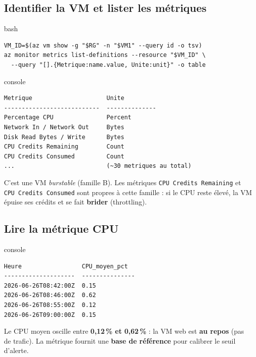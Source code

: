 \documentclass[11pt,a4paper]{article}
\newcommand{\code}[1]{\texttt{#1}}
\begin{document}
\subsection{Identifier la VM et lister les métriques}
\begin{codebox}{bash}
\begin{Verbatim}
VM_ID=$(az vm show -g "$RG" -n "$VM1" --query id -o tsv)
az monitor metrics list-definitions --resource "$VM_ID" \
  --query "[].{Metrique:name.value, Unite:unit}" -o table
\end{Verbatim}
\end{codebox}
\begin{codebox}{console}
\begin{Verbatim}
Metrique                     Unite
---------------------------  --------------
Percentage CPU               Percent
Network In / Network Out     Bytes
Disk Read Bytes / Write      Bytes
CPU Credits Remaining        Count
CPU Credits Consumed         Count
...                          (~30 metriques au total)
\end{Verbatim}
\end{codebox}
\begin{tipbox}
C'est une VM \textit{burstable} (famille B). Les métriques \code{CPU Credits Remaining} et \code{CPU Credits Consumed} sont propres à cette famille : si le CPU reste élevé, la VM épuise ses crédits et se fait \textbf{brider} (throttling).
\end{tipbox}

\subsection{Lire la métrique CPU}
\begin{codebox}{console}
\begin{Verbatim}
Heure                 CPU_moyen_pct
--------------------  ---------------
2026-06-26T08:42:00Z  0.15
2026-06-26T08:46:00Z  0.62
2026-06-26T08:55:00Z  0.12
2026-06-26T09:00:00Z  0.15
\end{Verbatim}
\end{codebox}
Le CPU moyen oscille entre \textbf{0,12\,\% et 0,62\,\%} : la VM web est \textbf{au repos} (pas de trafic). La métrique fournit une \textbf{base de référence} pour calibrer le seuil d'alerte.
\end{document}
